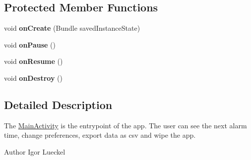 \subsection*{Protected Member Functions}
\begin{DoxyCompactItemize}
\item 
\hypertarget{classcom_1_1ovgu_1_1zim_1_1_main_activity_aef946129355d6b0aae9ceb83eb072878}{void {\bfseries on\-Create} (Bundle saved\-Instance\-State)}\label{classcom_1_1ovgu_1_1zim_1_1_main_activity_aef946129355d6b0aae9ceb83eb072878}

\item 
\hypertarget{classcom_1_1ovgu_1_1zim_1_1_main_activity_a32b82a2996c3aae5312f07f54cb4226c}{void {\bfseries on\-Pause} ()}\label{classcom_1_1ovgu_1_1zim_1_1_main_activity_a32b82a2996c3aae5312f07f54cb4226c}

\item 
\hypertarget{classcom_1_1ovgu_1_1zim_1_1_main_activity_a4d9b6d96d16d56f7c1bf1d9c8ea2f348}{void {\bfseries on\-Resume} ()}\label{classcom_1_1ovgu_1_1zim_1_1_main_activity_a4d9b6d96d16d56f7c1bf1d9c8ea2f348}

\item 
\hypertarget{classcom_1_1ovgu_1_1zim_1_1_main_activity_aa4f0e30996ad68faa4caf8785972129e}{void {\bfseries on\-Destroy} ()}\label{classcom_1_1ovgu_1_1zim_1_1_main_activity_aa4f0e30996ad68faa4caf8785972129e}

\end{DoxyCompactItemize}


\subsection{Detailed Description}
The \hyperlink{classcom_1_1ovgu_1_1zim_1_1_main_activity}{Main\-Activity} is the entrypoint of the app. The user can see the next alarm time, change preferences, export data as csv and wipe the app. \begin{DoxyAuthor}{Author}
Igor Lueckel 
\end{DoxyAuthor}


